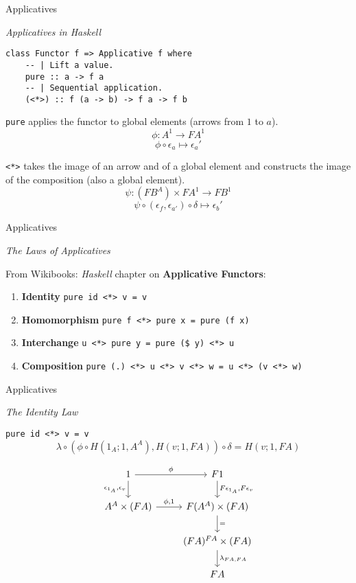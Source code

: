 \documentclass[10pt]{beamer}
\newcommand{\Com}[3]{#3^{#2}}
\newcommand{\strong}[1]{\textbf{#1}}
\theoremstyle{definition}
\theoremstyle{remark}
\numberwithin{equation}{section}
\begin{document}
\begin{frame}[fragile]{Applicatives}

  \emph{Applicatives in Haskell}

  \begin{lstlisting}[frame=single]
class Functor f => Applicative f where
    -- | Lift a value.
    pure :: a -> f a
    -- | Sequential application.
    (<*>) :: f (a -> b) -> f a -> f b
  \end{lstlisting}

  \lstinline{pure} applies the functor to global elements (arrows from $1$ to $a$).
  \[
  \phi : \Com{Hask}{1}{A} \rightarrow \Com{Hask}{1}{F A}
  \]
  \[
  \phi \circ \epsilon_a \mapsto \epsilon_a'
  \]

  \lstinline{<*>} takes the image of an arrow and of a global element and constructs the image of the composition (also a global element).
  \[
  \psi : (F \Com{Hask}{A}{B})\times\Com{Hask}{1}{F A} \rightarrow \Com{Hask}{1}{F B}
  \]
  \[
  \psi \circ (\epsilon_{f},\epsilon_{a'}) \circ \delta \mapsto \epsilon_b'
  \]

\end{frame}

\begin{frame}[fragile]{Applicatives}

  \emph{The Laws of Applicatives}

  From Wikibooks: \emph{Haskell} chapter on \strong{Applicative Functors}:
  
  \begin{enumerate}
  \item \strong{Identity}     \lstinline{pure id <*> v = v}
  \item \strong{Homomorphism} \lstinline{pure f <*> pure x = pure (f x)}
  \item \strong{Interchange}  \lstinline{u <*> pure y = pure ($ y) <*> u}
  \item \strong{Composition}  \lstinline{pure (.) <*> u <*> v <*> w = u <*> (v <*> w)}
  \end{enumerate}

\end{frame}

\begin{frame}[fragile]{Applicatives}

  \emph{The Identity Law}

  \lstinline{pure id <*> v = v}
  \[
  \lambda \circ (\phi \circ H(1_A;1,A^A),H(v;1,F A)) \circ \delta = H(v;1,F A)
  \]

  \[
  \begin{tikzcd}
    1 \arrow{r}{\phi}\arrow{d}[swap]{\epsilon_{1_A},\epsilon_v} & F 1 \arrow{d}{F \epsilon_{1_A},F \epsilon_v} \\
    \Com{C}{A}{A}\times (F A) \arrow{r}{\phi,1} & F (\Com{C}{A}{A}) \times (F A) \arrow{d}{=} \\
    & \Com{C}{F A}{(F A)} \times (F A) \arrow{d}{\lambda_{FA,FA}} \\
    & F A
  \end{tikzcd}
  \]

\end{frame}
\end{document}
